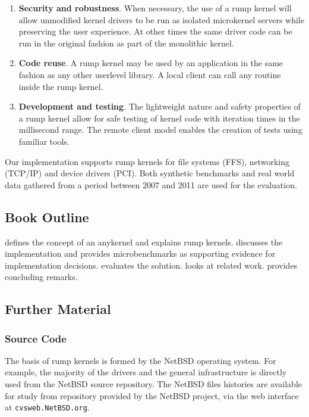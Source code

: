 \begin{enumerate}
\item   \textbf{Security and robustness}.
	When necessary, the use of a rump kernel will allow unmodified
	kernel drivers to be run as isolated microkernel servers
	while preserving the user experience.  At other times the
	same driver code can be run in the original fashion as part
	of the monolithic kernel.

\item	\textbf{Code reuse}.  A rump kernel may be used by an
	application in the same fashion as any other userlevel
	library.  A local client can call any routine inside the
	rump kernel.

\item	\textbf{Development and testing}.  The lightweight nature
	and safety properties of a rump kernel allow for safe testing
	of kernel code with iteration times in the millisecond range.
	The remote client model enables the creation of tests using
	familiar tools.
\end{enumerate}

Our implementation supports rump kernels for file systems (\eg FFS),
networking (\eg TCP/IP) and device drivers (\eg PCI).  Both synthetic
benchmarks and real world data gathered from a period between 2007 and
2011 are used for the evaluation.


\subsection{Book Outline}

 defines the concept of an anykernel and explains
rump kernels.
 discusses the implementation and provides
microbenchmarks as supporting evidence for implementation decisions.
 evaluates the solution.
 looks at related work.
 provides concluding remarks.


\subsection{Further Material}

\subsubsection{Source Code}
\label{sect:src}

The basis of rump kernels is formed by the NetBSD operating system.
For example, the majority of the drivers and the general infrastructure
is directly used from the NetBSD source repository.
The NetBSD files histories are available for study from repository
provided by the NetBSD project, \eg via the web interface at
\texttt{cvsweb.NetBSD.org}.

